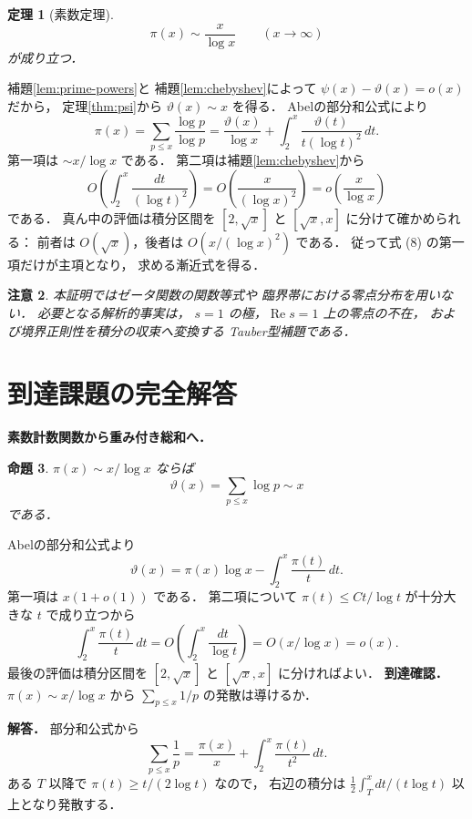 \documentclass[a5paper,10pt,onecolumn]{jsarticle}
\makeatletter
\theoremstyle{mathnotetheorem}
\newtheorem{theorem}{定理}[section]
\newtheorem{proposition}[theorem]{命題}
\newtheorem{remark}[theorem]{注意}
\renewcommand{\proofname}{証明}
\renewenvironment{proof}[1][\proofname]{%
  \par\pushQED{\qed}\normalfont\topsep4\p@\@plus2\p@\relax
  \trivlist\item[\hskip\labelsep\bfseries #1]\ignorespaces
}{\popQED\endtrivlist\@endpefalse}
\makeatother
\begin{document}
\begin{theorem}[素数定理]\label{thm:pnt}
\[
 \boxed{\displaystyle
 \pi(x)\sim\frac{x}{\log x}}
 \qquad(x\to\infty)
\]
が成り立つ．
\end{theorem}
\begin{proof}
補題\ref{lem:prime-powers}と
補題\ref{lem:chebyshev}によって
$\psi(x)-\vartheta(x)=o(x)$ だから，
定理\ref{thm:psi}から
$\vartheta(x)\sim x$ を得る．
Abelの部分和公式により
\[
 \pi(x)=\sum_{p\le x}\frac{\log p}{\log p}
 =\frac{\vartheta(x)}{\log x}
  +\int_2^x\frac{\vartheta(t)}
                 {t(\log t)^2}\,dt.
 \tag{8}
\]
第一項は $\sim x/\log x$ である．
第二項は補題\ref{lem:chebyshev}から
\[
 O\left(\int_2^x\frac{dt}{(\log t)^2}\right)
 =O\left(\frac{x}{(\log x)^2}\right)
 =o\left(\frac{x}{\log x}\right)
\]
である．
真ん中の評価は積分区間を
$[2,\sqrt x]$ と $[\sqrt x,x]$ に分けて確かめられる：
前者は $O(\sqrt x)$，後者は
$O(x/(\log x)^2)$ である．
従って式 (8) の第一項だけが主項となり，
求める漸近式を得る．
\end{proof}

\begin{remark}
本証明ではゼータ関数の関数等式や
臨界帯における零点分布を用いない．
必要となる解析的事実は，
$s=1$ の極，$\operatorname{Re}s=1$ 上の零点の不在，
および境界正則性を積分の収束へ変換する
Tauber型補題である．
\end{remark}

\section{到達課題の完全解答}
\noindent\textbf{素数計数関数から重み付き総和へ．}
\begin{proposition}
$\pi(x)\sim x/\log x$ ならば
\[
\vartheta(x)=\sum_{p\le x}\log p\sim x
\]
である．
\end{proposition}
\begin{proof}
Abelの部分和公式より
\[
\vartheta(x)
=\pi(x)\log x-\int_2^x\frac{\pi(t)}t\,dt.
\]
第一項は $x(1+o(1))$ である．
第二項について $\pi(t)\le Ct/\log t$ が十分大きな
$t$ で成り立つから
\[
\int_2^x\frac{\pi(t)}t\,dt
=O\left(\int_2^x\frac{dt}{\log t}\right)
=O(x/\log x)=o(x).
\]
最後の評価は積分区間を
$[2,\sqrt x]$ と $[\sqrt x,x]$ に分ければよい．
\end{proof}
\noindent\textbf{到達確認．}
$\pi(x)\sim x/\log x$ から
$\sum_{p\le x}1/p$ の発散は導けるか．
\par\noindent\textbf{解答．}
部分和公式から
\[
\sum_{p\le x}\frac1p
=\frac{\pi(x)}x+\int_2^x\frac{\pi(t)}{t^2}\,dt.
\]
ある $T$ 以降で $\pi(t)\ge t/(2\log t)$ なので，
右辺の積分は
$\frac12\int_T^x dt/(t\log t)$ 以上となり発散する．
\end{document}
